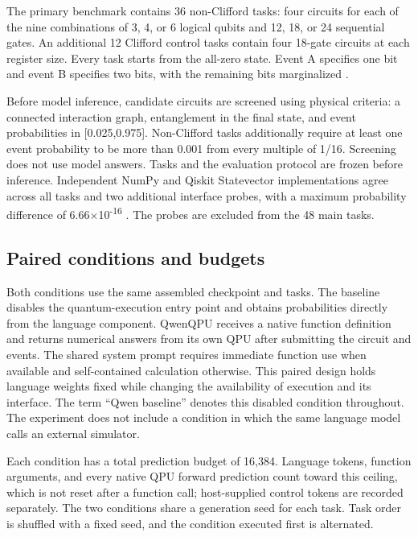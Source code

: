 \documentclass[11pt,a4paper]{article}
\begin{document}
The primary benchmark contains 36 non-Clifford tasks: four circuits for each of the nine combinations of 3, 4, or 6 logical qubits and 12, 18, or 24 sequential gates. An additional 12 Clifford control tasks contain four 18-gate circuits at each register size. Every task starts from the all-zero state. Event A specifies one bit and event B specifies two bits, with the remaining bits marginalized \cite{ref25}.

Before model inference, candidate circuits are screened using physical criteria: a connected interaction graph, entanglement in the final state, and event probabilities in {[}0.025,0.975{]}. Non-Clifford tasks additionally require at least one event probability to be more than 0.001 from every multiple of 1/16. Screening does not use model answers. Tasks and the evaluation protocol are frozen before inference. Independent NumPy and Qiskit Statevector implementations \cite{ref26} agree across all tasks and two additional interface probes, with a maximum probability difference of 6.66\ensuremath{\times}10\textsuperscript{-16} \cite{ref25}. The probes are excluded from the 48 main tasks.

\subsection{Paired conditions and budgets}

Both conditions use the same assembled checkpoint and tasks. The baseline disables the quantum-execution entry point and obtains probabilities directly from the language component. QwenQPU receives a native function definition and returns numerical answers from its own QPU after submitting the circuit and events. The shared system prompt requires immediate function use when available and self-contained calculation otherwise. This paired design holds language weights fixed while changing the availability of execution and its interface. The term ``Qwen baseline'' denotes this disabled condition throughout. The experiment does not include a condition in which the same language model calls an external simulator.

Each condition has a total prediction budget of 16,384. Language tokens, function arguments, and every native QPU forward prediction count toward this ceiling, which is not reset after a function call; host-supplied control tokens are recorded separately. The two conditions share a generation seed for each task. Task order is shuffled with a fixed seed, and the condition executed first is alternated.
\end{document}
